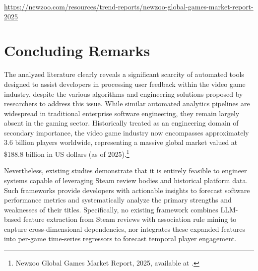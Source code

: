 \urldef{\newzoourl}\url{https://newzoo.com/resources/trend-reports/newzoo-global-games-market-report-2025}
\section{Concluding Remarks}
\noindent The analyzed literature clearly reveals a significant scarcity of automated tools designed to assist developers in processing user feedback within the video game industry, despite the various algorithms and engineering solutions proposed by researchers to address this issue. While similar automated analytics pipelines are widespread in traditional enterprise software engineering, they remain largely absent in the gaming sector. Historically treated as an engineering domain of secondary importance, the video game industry now encompasses approximately 3.6 billion players worldwide, representing a massive global market valued at \$188.8 billion in US dollars (as of 2025).\footnote{Newzoo Global Games Market Report, 2025, available at \newzoourl.}

Nevertheless, existing studies demonstrate that it is entirely feasible to engineer systems capable of leveraging Steam review bodies and historical platform data. Such frameworks provide developers with actionable insights to forecast software performance metrics and systematically analyze the primary strengths and weaknesses of their titles. Specifically, no existing framework combines LLM-based feature extraction from Steam reviews with association rule mining to capture cross-dimensional dependencies, nor integrates these expanded features into per-game time-series regressors to forecast temporal player engagement.